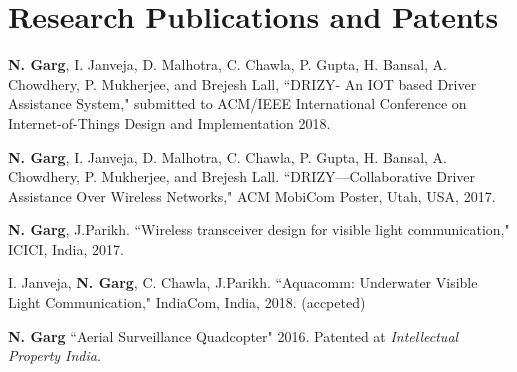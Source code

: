 \section{Research Publications and Patents}
\begin{bibsection}
    \item \textbf{N. Garg}, I. Janveja, D. Malhotra, C. Chawla, P. Gupta, H. Bansal, A. Chowdhery, P. Mukherjee, and Brejesh Lall, ``DRIZY- An IOT based Driver Assistance System," submitted to ACM/IEEE International Conference on Internet-of-Things Design and Implementation 2018.
    \item \textbf{N. Garg}, I. Janveja, D. Malhotra, C. Chawla, P. Gupta, H. Bansal, A. Chowdhery, P. Mukherjee, and Brejesh Lall. ``DRIZY---Collaborative Driver Assistance Over Wireless Networks," ACM MobiCom Poster, Utah, USA, 2017.
    \item \textbf{N. Garg}, J.Parikh. ``Wireless transceiver design for visible light communication," ICICI, India, 2017.
    \item I. Janveja, \textbf{N. Garg}, C. Chawla, J.Parikh. ``Aquacomm: Underwater Visible Light Communication," IndiaCom, India, 2018. (accpeted)
    \item \textbf{N. Garg} ``Aerial Surveillance Quadcopter" 2016. Patented at \emph{Intellectual Property India}.
\end{bibsection}

